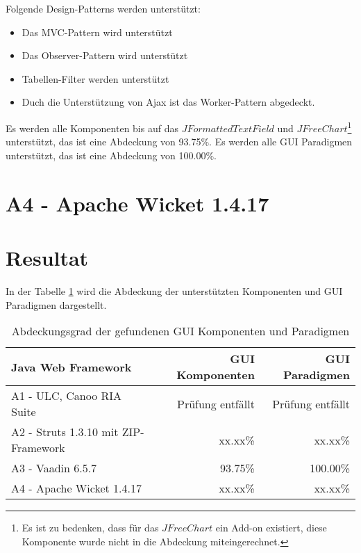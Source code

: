 \noindent
Folgende Design-Patterns werden unterstützt:

\begin{itemize}
  \item Das MVC-Pattern wird unterstützt
  \item Das Observer-Pattern wird unterstützt
  \item Tabellen-Filter werden unterstützt
  \item Duch die Unterstützung von Ajax ist das Worker-Pattern abgedeckt.
\end{itemize}

\noindent
Es werden alle Komponenten bis auf das \(JFormattedTextField\) und
\(JFreeChart\)\footnote{Es ist zu bedenken, dass für das \(JFreeChart\) ein
Add-on existiert, diese Komponente wurde nicht in die Abdeckung
miteingerechnet.} unterstützt, das ist eine Abdeckung von 93.75\%. Es werden
alle GUI Paradigmen unterstützt, das ist eine Abdeckung von 100.00\%.

\section{A4 - Apache Wicket 1.4.17}

\section{Resultat}

In der Tabelle \ref{tab:unterstuetztungDerKomponenten} wird die Abdeckung der
unterstützten Komponenten und GUI Paradigmen dargestellt.
\newline

\begin{table}[!h]
  \sffamily 
  \begin{center}
    \begin{tabular}{lrr}
      \toprule
      \textbf{Java Web Framework} & \textbf{GUI Komponenten} & \textbf{GUI
      Paradigmen}\\
      \midrule
      A1 - ULC, Canoo RIA Suite & Prüfung entfällt & Prüfung entfällt\\
      A2 - Struts 1.3.10 mit ZIP-Framework & xx.xx\% & xx.xx\%\\
      A3 - Vaadin 6.5.7 & 93.75\% & 100.00\%\\
      A4 - Apache Wicket 1.4.17 & xx.xx\% & xx.xx\%\\
      \bottomrule
    \end{tabular}
    \caption{Abdeckungsgrad der gefundenen GUI Komponenten und Paradigmen}
    \label{tab:unterstuetztungDerKomponenten}
  \end{center}
\end{table}